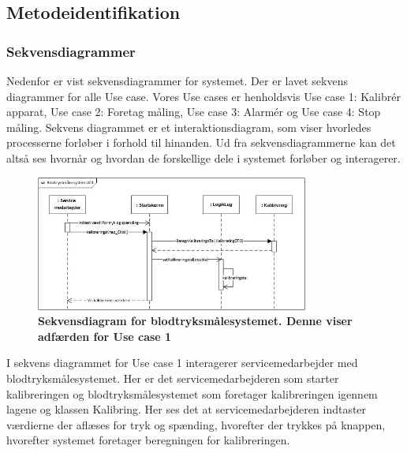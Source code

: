 \subsection{Metodeidentifikation}
\subsubsection{Sekvensdiagrammer}
Nedenfor er vist sekvensdiagrammer for systemet. Der er lavet sekvens diagrammer for alle Use case. Vores Use cases er henholdsvis Use case 1: Kalibrér apparat, Use case 2: Foretag måling, Use case 3: Alarmér og Use case 4: Stop måling. Sekvens diagrammet er et interaktionsdiagram, som viser hvorledes processerne forløber i forhold til hinanden. Ud fra sekvensdiagrammerne kan det altså ses hvornår og hvordan de forskellige dele i systemet forløber og interagerer. \\
\begin{figure}[H]
\includegraphics[width =0.8\textwidth , center]{billeder/sdUC1}
\caption{\textbf{Sekvensdiagram for blodtryksmålesystemet. Denne viser adfærden for Use case 1 }}
\end{figure}
I sekvens diagrammet for Use case 1 interagerer servicemedarbejder med blodtryksmålesystemet. Her er det servicemedarbejderen som starter kalibreringen og blodtryksmålesystemet som foretager kalibreringen igennem lagene og klassen Kalibring. Her ses det at servicemedarbejderen indtaster værdierne der aflæses for tryk og spænding, hvorefter der trykkes på knappen, hvorefter systemet foretager beregningen for kalibreringen. 
